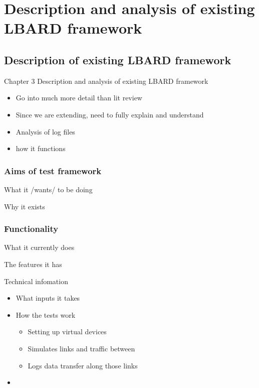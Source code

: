 
\chapter{Description and analysis of existing LBARD framework} %

\label{Chapter3} %


\section{Description of existing LBARD framework}
Chapter 3
Description and analysis of existing LBARD framework
\begin{itemize}
    \item Go into much more detail than lit review
    \item Since we are extending, need to fully explain and understand
    \item Analysis of log files
    \item how it functions
    
\end{itemize}


\subsection{Aims of test framework}
What it /wants/ to be doing

Why it exists





\subsection{Functionality}
What it currently does

The features it has

Technical infomation
\begin{itemize}
    \item What inputs it takes
    \item How the tests work
    \begin{itemize}
        \item Setting up virtual devices
        \item Simulates links and traffic between
        \item Logs data transfer along those links
    \end{itemize}
    \item 
\end{itemize}


